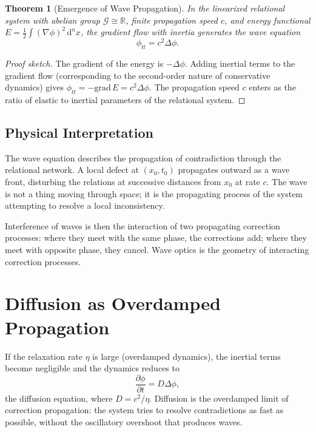 \documentclass[12pt,a4paper,openany]{book}
\theoremstyle{plain}
\newtheorem{theorem}{Theorem}[chapter]
\theoremstyle{definition}
\theoremstyle{remark}
\newcommand{\GG}{\mathcal{G}}
\newcommand{\RR}{\mathbb{R}}
\newcommand{\Energy}{E}
\newcommand{\dvol}{\,\mathrm{d}^n x}
\newcommand{\del}{\partial}
\newcommand{\grad}{\nabla}
\newcommand{\lap}{\Delta}
\begin{document}
\begin{theorem}[Emergence of Wave Propagation]
In the linearized relational system with abelian group $\GG \cong \RR$, finite propagation speed $c$, and energy functional $\Energy = \frac{1}{2} \int (\grad \phi)^2 \dvol$, the gradient flow with inertia generates the wave equation
\[
\phi_{tt} = c^2 \lap \phi.
\]
\end{theorem}

\begin{proof}[Proof sketch]
The gradient of the energy is $-\lap \phi$. Adding inertial terms to the gradient flow (corresponding to the second-order nature of conservative dynamics) gives $\phi_{tt} = -\text{grad}\, \Energy = c^2 \lap \phi$. The propagation speed $c$ enters as the ratio of elastic to inertial parameters of the relational system.
\end{proof}

\subsection{Physical Interpretation}

The wave equation describes the propagation of contradiction through the relational network. A local defect at $(x_0, t_0)$ propagates outward as a wave front, disturbing the relations at successive distances from $x_0$ at rate $c$. The wave is not a thing moving through space; it is the propagating process of the system attempting to resolve a local inconsistency.

Interference of waves is then the interaction of two propagating correction processes: where they meet with the same phase, the corrections add; where they meet with opposite phase, they cancel. Wave optics is the geometry of interacting correction processes.

\section{Diffusion as Overdamped Propagation}

If the relaxation rate $\eta$ is large (overdamped dynamics), the inertial terms become negligible and the dynamics reduces to
\[
\frac{\del \phi}{\del t} = D \lap \phi,
\]
the diffusion equation, where $D = c^2 / \eta$. Diffusion is the overdamped limit of correction propagation: the system tries to resolve contradictions as fast as possible, without the oscillatory overshoot that produces waves.
\end{document}
